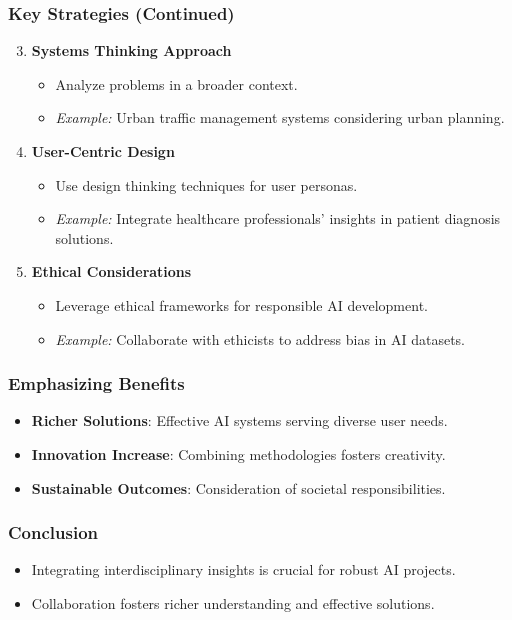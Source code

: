 \documentclass[aspectratio=169]{beamer}
\begin{document}
\begin{frame}[fragile]
    \frametitle{Key Strategies (Continued)}
    \begin{enumerate}
        \setcounter{enumi}{2} %
        \item \textbf{Systems Thinking Approach}
            \begin{itemize}
                \item Analyze problems in a broader context.
                \item \textit{Example:} Urban traffic management systems considering urban planning.
            \end{itemize}
        \item \textbf{User-Centric Design}
            \begin{itemize}
                \item Use design thinking techniques for user personas.
                \item \textit{Example:} Integrate healthcare professionals’ insights in patient diagnosis solutions.
            \end{itemize}
        \item \textbf{Ethical Considerations}
            \begin{itemize}
                \item Leverage ethical frameworks for responsible AI development.
                \item \textit{Example:} Collaborate with ethicists to address bias in AI datasets.
            \end{itemize}
    \end{enumerate}
\end{frame}

\begin{frame}[fragile]
    \frametitle{Emphasizing Benefits}
    \begin{itemize}
        \item \textbf{Richer Solutions}: Effective AI systems serving diverse user needs.
        \item \textbf{Innovation Increase}: Combining methodologies fosters creativity.
        \item \textbf{Sustainable Outcomes}: Consideration of societal responsibilities.
    \end{itemize}
\end{frame}

\begin{frame}[fragile]
    \frametitle{Conclusion}
    \begin{itemize}
        \item Integrating interdisciplinary insights is crucial for robust AI projects.
        \item Collaboration fosters richer understanding and effective solutions.
    \end{itemize}
\end{frame}
\end{document}

